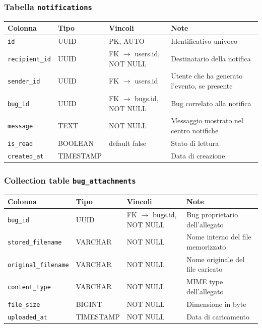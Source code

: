 ﻿\documentclass[a4paper,11pt]{article}
\begin{document}
\subsubsection{Tabella \texttt{notifications}}

\begin{tabular}{|l|l|l|p{5cm}|}
\hline
\textbf{Colonna} & \textbf{Tipo} & \textbf{Vincoli} & \textbf{Note} \\
\hline
\texttt{id} & UUID & PK, AUTO & Identificativo univoco \\
\hline
\texttt{recipient\_id} & UUID & FK $\to$ users.id, NOT NULL & Destinatario della notifica \\
\hline
\texttt{sender\_id} & UUID & FK $\to$ users.id & Utente che ha generato l'evento, se presente \\
\hline
\texttt{bug\_id} & UUID & FK $\to$ bugs.id, NOT NULL & Bug correlato alla notifica \\
\hline
\texttt{message} & TEXT & NOT NULL & Messaggio mostrato nel centro notifiche \\
\hline
\texttt{is\_read} & BOOLEAN & default false & Stato di lettura \\
\hline
\texttt{created\_at} & TIMESTAMP & & Data di creazione \\
\hline
\end{tabular}

\subsubsection{Collection table \texttt{bug\_attachments}}

\begin{tabular}{|l|l|l|p{5cm}|}
\hline
\textbf{Colonna} & \textbf{Tipo} & \textbf{Vincoli} & \textbf{Note} \\
\hline
\texttt{bug\_id} & UUID & FK $\to$ bugs.id, NOT NULL & Bug proprietario dell'allegato \\
\hline
\texttt{stored\_filename} & VARCHAR & NOT NULL & Nome interno del file memorizzato \\
\hline
\texttt{original\_filename} & VARCHAR & NOT NULL & Nome originale del file caricato \\
\hline
\texttt{content\_type} & VARCHAR & NOT NULL & MIME type dell'allegato \\
\hline
\texttt{file\_size} & BIGINT & NOT NULL & Dimensione in byte \\
\hline
\texttt{uploaded\_at} & TIMESTAMP & NOT NULL & Data di caricamento \\
\hline
\end{tabular}
\end{document}
